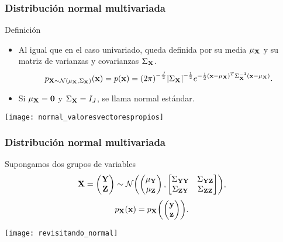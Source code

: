\documentclass[table]{beamer}
\begin{document}
\begin{frame}
    \frametitle{Distribución normal multivariada}
    \begin{block}{Definición}
        \begin{itemize}
            \item Al igual que en el caso univariado, queda definida por su media $\mu_{\mathbf{X}}$ y su matriz de varianzas y covarianzas $\Sigma_{\mathbf{X}}$.
                \begin{equation*}
                    \ppdf{\Xvec \sim \normal{\mu_{\Xvec}}{\Sigma_{\Xvec}}}{\xvec} = \pdf{\xvec} = \parens{2 \pi}^{- \frac{J}{2}} \vparens{\Sigma_{\Xvec}}^{- \frac{1}{2}}
                    e^{- \frac{1}{2} \parens{\xvec - \mu_{\Xvec}}^{T} \Sigma_{\Xvec}^{-1} \parens{\xvec - \mu_{\Xvec}}} .
                \end{equation*}
            \item Si $\mu_{\mathbf{X}} = \mathbf{0}$ y $\Sigma_{\mathbf{X}} = I_{J}$, se llama normal estándar.
        \end{itemize}
    \end{block}
    \begin{center}
        \texttt{[image: normal\_valoresvectorespropios]}
    \end{center}
\end{frame}

\begin{frame}
    \frametitle{Distribución normal multivariada}
    \begin{block}{Supongamos dos grupos de variables}
        \begin{equation*}
            \Xvec = \begin{pmatrix} \Yvec \\ \Zvec \end{pmatrix}
            \sim \normal{\begin{pmatrix} \mu_{\Yvec} \\ \mu_{\Zvec} \end{pmatrix}}{\begin{bmatrix} \Sigma_{\Yvec \Yvec} & \Sigma_{\Yvec \Zvec} \\ \Sigma_{\Zvec \Yvec} & \Sigma_{\Zvec \Zvec} \end{bmatrix}} ,
        \end{equation*}
        \begin{equation*}
            \ppdf{\Xvec}{\xvec} = \ppdf{\Xvec}{\begin{pmatrix} \yvec \\ \zvec \end{pmatrix}} .
        \end{equation*}
    \end{block}
    \begin{center}
        \texttt{[image: revisitando\_normal]}
    \end{center}
\end{frame}
\end{document}
